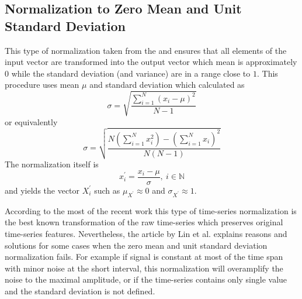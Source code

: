\subsection{Normalization to Zero Mean and Unit Standard Deviation} \label{sect:normalization}
This type of normalization taken from the \cite{citeulike:3815880} and ensures that all elements of the input vector are transformed into the output vector which mean is approximately $0$ while the standard deviation (and variance) are in a range close to $1$.
This procedure uses mean $\mu$ and standard deviation which calculated as 
\begin{equation}
\sigma = \sqrt{ \frac{ \sum_{i=1}^{N} (x_{i} - \mu)^{2} }{ N - 1 } }
\end{equation}
or equivalently
\begin{equation}
\sigma = \sqrt{ \frac{
                  N \left( \sum_{i=1}^{N} x_{i}^{2}  \right) - 
                  \left( \sum_{i=1}^{N} x_{i} \right) ^{2}
                }{
                  N(N-1)
                }  
          }
\end{equation}
The normalization itself is 
\begin{equation}
x_{i}^{'} = \frac{x_{i} - \mu}{\sigma}, \: i \in \mathbb{N}
\end{equation}
and yields the vector $X_{i}^{'}$ such as $\mu_{X^{'}} \approx 0$ and $\sigma_{X^{'}} \approx 1$.

According to the most of the recent work \cite{citeulike:3815880} \cite{citeulike:2821475} \cite{citeulike:3978002} this type of time-series normalization is the best known transformation of the raw time-series which preserves original time-series features. Nevertheless, the article by Lin et al. \cite{citeulike:2821475} explains reasons and solutions for some cases when the zero mean and unit standard deviation normalization fails. For example if signal is constant at most of the time span with minor noise at the short interval, this normalization will overamplify the noise to the maximal amplitude, or if the time-series contains only single value and the standard deviation is not defined.